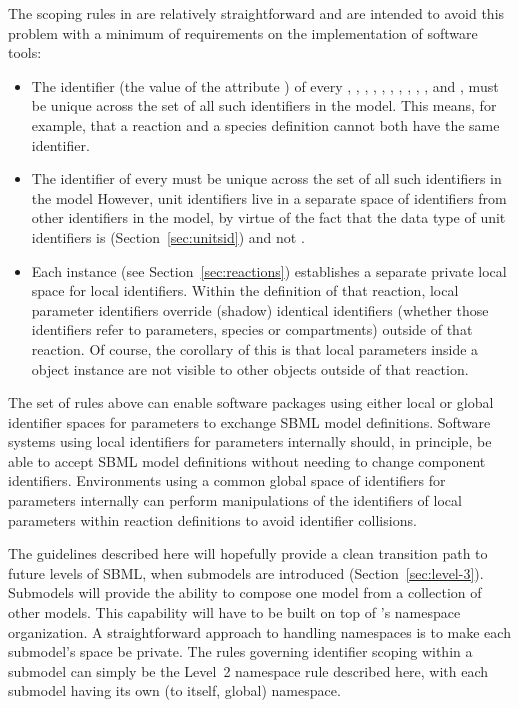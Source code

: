 The scoping rules in \sbmltwo are relatively
straightforward and are intended to avoid this problem with a
minimum of requirements on the implementation of software tools:
\begin{itemize}
  
\item The identifier (\ie the value of the attribute ) of
  every \FunctionDefinition, \CompartmentType, \SpeciesType,
  \Compartment, \Species, \Parameter, \Reaction,
  \SpeciesReference, \ModifierSpeciesReference, \Event, and
  \Model, must be unique across the set of all such identifiers in
  the model.  This means, for example, that a reaction and a
  species definition cannot both have the same identifier.

\item The identifier of every \UnitDefinition must be unique
  across the set of all such identifiers in the model   However,
  unit identifiers live in a separate space of identifiers from
  other identifiers in the model, by virtue of
    the fact that the data type of unit identifiers is
     (Section~\ref{sec:unitsid}) and not
    .
  
\item Each \Reaction instance (see Section~\ref{sec:reactions})
  establishes a separate private local space for local \Parameter
  identifiers.  Within the definition of that reaction, local
  parameter identifiers override (shadow) identical identifiers
  (whether those identifiers refer to parameters, species
    or compartments) outside of that reaction.  Of course, the
  corollary of this is
  that local parameters inside a \Reaction object instance are not
  visible to other objects outside of that reaction.

\end{itemize}
The set of rules above can enable software packages using either
local or global identifier spaces for parameters to exchange SBML
model definitions.  Software systems using local identifiers for
parameters internally should, in principle, be able to accept SBML
model definitions without needing to change component identifiers.
Environments using a common global space of identifiers for
parameters internally can perform manipulations of the identifiers
of local parameters within reaction definitions to avoid
identifier collisions.

The guidelines described here will hopefully provide a clean
transition path to future levels of SBML, when submodels are
introduced (Section~\ref{sec:level-3}).  Submodels will provide
the ability to compose one model from a collection of other
models.  This capability will have to be built on top of
\sbmltwo's namespace organization.  A straightforward approach to
handling namespaces is to make each submodel's space be private.
The rules governing identifier scoping within a submodel can
simply be the Level~2 namespace rule described here, with each
submodel having its own (to itself, global) namespace.


